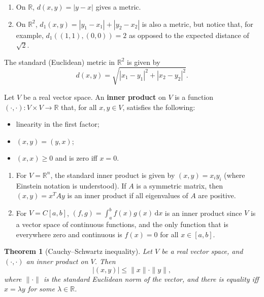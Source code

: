 \documentclass[letter-paper]{tufte-book}
\newtheorem{theorem}{\color{pastel-blue}Theorem}[section]
\newenvironment{example}[1][Example]{\begin{trivlist}
\item[\hskip \labelsep {\bfseries #1}]}{\end{trivlist}}
\begin{document}
\begin{example}
  \begin{enumerate}
    \item On $\mathbb{R}$, $d(x,y) = |y - x|$ gives a metric.
    \item On $\mathbb{R}^2$, $d_1 (x, y) = |y_1 - x_1| + |y_2 - x_2|$ is also a
    metric, but notice that, for example, $d_1( (1, 1), (0, 0) ) = 2$ as opposed
    to the expected distance of $\sqrt{2}$.
  \end{enumerate}
\end{example}

The standard (Euclidean) metric in $\mathbb{R}^2$ is given by
\begin{equation*}
  d(x, y) = \sqrt{|x_1 - y_1|^2 + |x_2 - y_2|^2}.
\end{equation*}

Let $V$ be a real vector space. An \textbf{inner product} on $V$ is a function
$(\cdot, \cdot) : V\times V\to \mathbb{R}$ that, for all $x, y \in V$, satisfies
the following:
\begin{itemize}
  \item linearity in the first factor;
  \item $(x, y) = (y, x)$;
  \item $(x, x) \geq 0$ and is zero iff $x = 0$.
\end{itemize}
\begin{example}
  \begin{enumerate}
    \item For $V = \mathbb{R}^n$, the standard inner product is given by $(x, y)
    = x_i y_i$ (where Einstein notation is understood). If $A$ is a symmetric
    matrix, then $(x, y) = x^T A y$ is an inner product if all eigenvalues of
    $A$ are positive.
    
    \item For $V = C[a, b]$, $(f, g) = \int_a^b f(x) g(x)\, \mathrm{d}x$ is an
    inner product since $V$ is a vector space of continuous functions, and the
    only function that is everywhere zero and continuous is $f(x) = 0$ for all
    $x\in[a, b]$.
  \end{enumerate}
\end{example}

\begin{theorem}[Cauchy--Schwartz inequality]
  Let $V$ be a real vector space, and $(\cdot, \cdot)$ an inner product on $V$.
  Then
  \begin{equation*}
    \left|(x, y)\right| \leq \|x\| \cdot \|y\|,
  \end{equation*}
  where $\|\cdot\|$ is the standard Euclidean norm of the vector, and there is
  equality iff $x = \lambda y$ for some $\lambda \in \mathbb{R}$.
\end{theorem}
\end{document}
